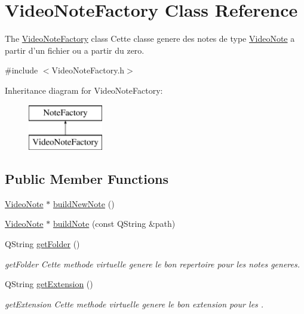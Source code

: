 \hypertarget{class_video_note_factory}{\section{Video\-Note\-Factory Class Reference}
\label{class_video_note_factory}
}


The \hyperlink{class_video_note_factory}{Video\-Note\-Factory} class Cette classe genere des notes de type \hyperlink{class_video_note}{Video\-Note} a partir d'un fichier ou a partir du zero.  




{\ttfamily \#include $<$Video\-Note\-Factory.\-h$>$}

Inheritance diagram for Video\-Note\-Factory\-:\begin{figure}[H]
\begin{center}
\leavevmode
\includegraphics[height=2.000000cm]{class_video_note_factory}
\end{center}
\end{figure}
\subsection*{Public Member Functions}
\begin{DoxyCompactItemize}
\item 
\hyperlink{class_video_note}{Video\-Note} $\ast$ \hyperlink{class_video_note_factory_a9781f7cf25fade4e28ee26e24b7343eb}{build\-New\-Note} ()
\item 
\hyperlink{class_video_note}{Video\-Note} $\ast$ \hyperlink{class_video_note_factory_ab19052d39774211beac50662a0da7ed9}{build\-Note} (const Q\-String \&path)
\item 
Q\-String \hyperlink{class_video_note_factory_af7e338d6e4e5530ace6bf3184115939c}{get\-Folder} ()
\begin{DoxyCompactList}\small\item\em get\-Folder Cette methode virtuelle genere le bon repertoire pour les notes generes. \end{DoxyCompactList}\item 
Q\-String \hyperlink{class_video_note_factory_ae64d7752275a4c33786db2ea6934c4be}{get\-Extension} ()
\begin{DoxyCompactList}\small\item\em get\-Extension Cette methode virtuelle genere le bon extension pour les . \end{DoxyCompactList}\end{DoxyCompactItemize}
